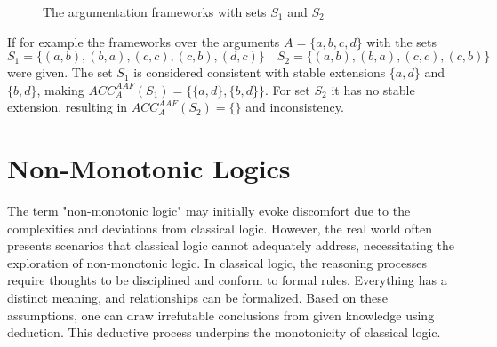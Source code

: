 \begin{figure}
      \centering
      \qquad
      \caption{The argumentation frameworks with sets \(S_1\) and \(S_2\)}
\end{figure}

If for example the frameworks over the arguments \(A = \{a,b,c,d\}\) with the sets
\[S_1 = \{(a,b),(b,a),(c,c),(c,b),(d,c)\} \quad S_2 = \{(a,b),(b,a),(c,c),(c,b)\}\]
were given.
The set \(S_1\) is considered consistent with stable extensions \(\{a,d\}\) and \(\{b,d\}\), making \(ACC^{AAF}_{A}(S_1) = \{\{a,d\},\{b,d\}\}\).
For set \(S_2\) it has no stable extension, resulting in \(ACC^{AAF}_{A}(S_2) = \{\}\) and inconsistency.

\section{Non-Monotonic Logics}
The term "non-monotonic logic" may initially evoke discomfort due to the complexities and deviations from classical logic.
However, the real world often presents scenarios that classical logic cannot adequately address, necessitating the exploration of non-monotonic logic.
In classical logic, the reasoning processes require thoughts to be disciplined and conform to formal rules.
Everything has a distinct meaning, and relationships can be formalized. Based on these assumptions, one can draw irrefutable conclusions from given knowledge using deduction.
This deductive process underpins the monotonicity of classical logic.

